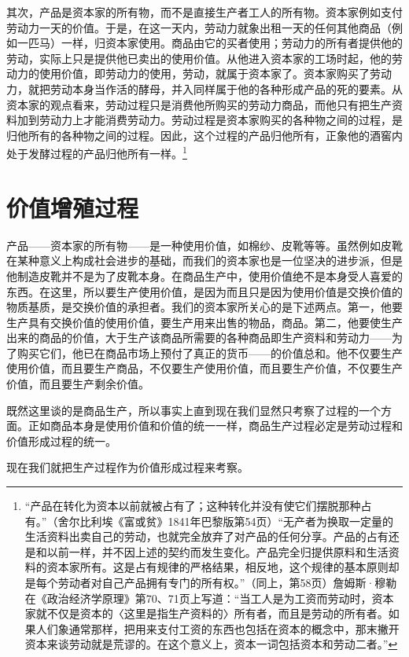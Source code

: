 \documentclass{ctexbook}
\begin{document}
    其次，产品是资本家的所有物，而不是直接生产者工人的所有物。资本家例如支付劳动力一天的价值。于是，在这一天内，劳动力就象出租一天的任何其他商品（例如一匹马）一样，归资本家使用。商品由它的买者使用；劳动力的所有者提供他的劳动，实际上只是提供他已卖出的使用价值。从他进入资本家的工场时起，他的劳动力的使用价值，即劳动力的使用，劳动，就属于资本家了。资本家购买了劳动力，就把劳动本身当作活的酵母，并入同样属于他的各种形成产品的死的要素。从资本家的观点看来，劳动过程只是消费他所购买的劳动力商品，而他只有把生产资料加到劳动力上才能消费劳动力。劳动过程是资本家购买的各种物之间的过程，是归他所有的各种物之间的过程。因此，这个过程的产品归他所有，正象他的酒窖内处于发酵过程的产品归他所有一样。\footnote{“产品在转化为资本以前就被占有了；这种转化并没有使它们摆脱那种占有。”（舍尔比利埃《富或贫》1841年巴黎版第54页）“无产者为换取一定量的生活资料出卖自己的劳动，也就完全放弃了对产品的任何分享。产品的占有还是和以前一样，并不因上述的契约而发生变化。产品完全归提供原料和生活资料的资本家所有。这是占有规律的严格结果，相反地，这个规律的基本原则却是每个劳动者对自己产品拥有专门的所有权。”（同上，第58页）詹姆斯·穆勒在《政治经济学原理》第70、71页上写道：“当工人是为工资而劳动时，资本家就不仅是资本的〈这里是指生产资料的〉所有者，而且是劳动的所有者。如果人们象通常那样，把用来支付工资的东西也包括在资本的概念中，那末撇开资本来谈劳动就是荒谬的。在这个意义上，资本一词包括资本和劳动二者。”}

    \section{价值增殖过程}

        
    产品——资本家的所有物——是一种使用价值，如棉纱、皮靴等等。虽然例如皮靴在某种意义上构成社会进步的基础，而我们的资本家也是一位坚决的进步派，但是他制造皮靴并不是为了皮靴本身。在商品生产中，使用价值绝不是本身受人喜爱的东西。在这里，所以要生产使用价值，是因为而且只是因为使用价值是交换价值的物质基质，是交换价值的承担者。我们的资本家所关心的是下述两点。第一，他要生产具有交换价值的使用价值，要生产用来出售的物品，商品。第二，他要使生产出来的商品的价值，大于生产该商品所需要的各种商品即生产资料和劳动力——为了购买它们，他已在商品市场上预付了真正的货币——的价值总和。他不仅要生产使用价值，而且要生产商品，不仅要生产使用价值，而且要生产价值，不仅要生产价值，而且要生产剩余价值。
    
    既然这里谈的是商品生产，所以事实上直到现在我们显然只考察了过程的一个方面。正如商品本身是使用价值和价值的统一一样，商品生产过程必定是劳动过程和价值形成过程的统一。
    
    现在我们就把生产过程作为价值形成过程来考察。
    
\end{document}
